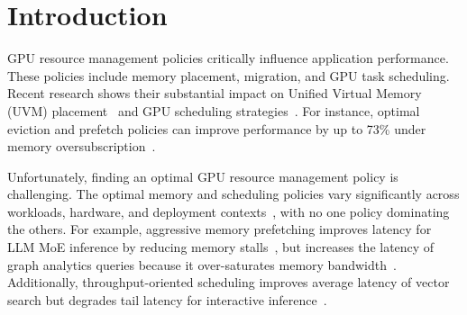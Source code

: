 \section{Introduction}

GPU resource management policies critically influence application performance.
These policies include memory placement, migration, and GPU task scheduling.
Recent research shows their substantial impact on Unified Virtual Memory (UVM) placement~\cite{wang2024suv,lin2025forest,kim2025dream,park2025helm} and GPU scheduling strategies~\cite{wang2024gcaps,fan2025gpreempt,shen2025xsched}.
For instance, optimal eviction and prefetch policies can improve performance by up to 73\% under memory oversubscription~\cite{park2025helm,kehne2019etc,ganguly2019interplay}.

Unfortunately, finding an optimal GPU resource management policy is challenging.
The optimal memory and scheduling policies vary significantly across workloads, hardware, and deployment contexts~\cite{kwon2023efficient,agrawal2024taming,lin2024towards,wang2016gunrock,shoeybi2019megatron,rasley2020deepspeed,pan2024survey,cao2023gpu}, with no one policy dominating the others.
For example, aggressive memory prefetching improves latency for LLM MoE inference by reducing memory stalls~\cite{xue2025moeinfinity,yu2026finemoe}, but increases the latency of graph analytics queries because it over-saturates memory bandwidth~\cite{ganguly2019interplay}.
Additionally, throughput-oriented scheduling improves average latency of vector search but degrades tail latency for interactive inference~\cite{agrawal2024taming,fan2025gpreempt}.


